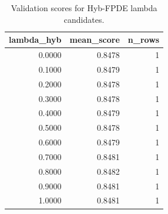 \begin{table}[t]
\caption{Validation scores for Hyb-FPDE lambda candidates.}
\label{tab:lambda_distribution_computed}
\centering
\begin{tabular}{rrr}
\toprule
lambda\_hyb & mean\_score & n\_rows \\
\midrule
0.0000 & 0.8478 & 1 \\
0.1000 & 0.8479 & 1 \\
0.2000 & 0.8478 & 1 \\
0.3000 & 0.8478 & 1 \\
0.4000 & 0.8479 & 1 \\
0.5000 & 0.8478 & 1 \\
0.6000 & 0.8479 & 1 \\
0.7000 & 0.8481 & 1 \\
0.8000 & 0.8482 & 1 \\
0.9000 & 0.8481 & 1 \\
1.0000 & 0.8481 & 1 \\
\bottomrule
\end{tabular}

\end{table}
